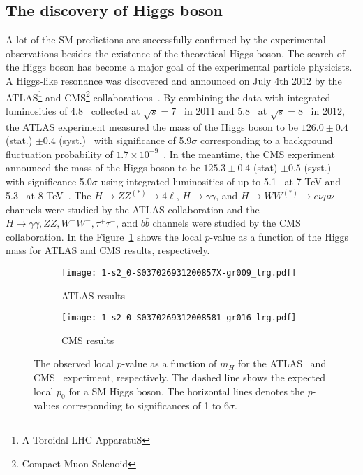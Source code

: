 \subsection{The discovery of Higgs boson}
A lot of the SM predictions are successfully confirmed by the experimental observations besides the existence of the theoretical Higgs boson. 
The search of the Higgs boson has become a major goal of the experimental particle physicists.
A Higgs-like resonance was discovered and announced on July 4th 2012 by the ATLAS\footnote{A Toroidal LHC ApparatuS} and CMS\footnote{Compact Muon Solenoid} collaborations~\cite{Aad:2012tfa,Chatrchyan:2012xdj}.
By combining the data with integrated luminosities of 4.8~{\ifb} collected at $\sqrt{s} = 7$~{\TeV} in 2011 and 5.8~{\ifb} at $\sqrt{s}=8$~{\TeV} in 2012, the ATLAS experiment measured the mass of the Higgs boson to be $126.0 \pm 0.4$ (stat.) $\pm 0.4$ (syst.)~{\GeV} with significance of 5.9$\sigma$ corresponding to a background fluctuation probability of $1.7 \times 10^{-9}$~\cite{Aad:2012tfa}.
In the meantime, the CMS experiment announced the mass of the Higgs boson to be $125.3 \pm 0.4$ (stat) $\pm 0.5$ (syst.)~{\GeV} with significance 5.0$\sigma$ using integrated luminosities of up to 5.1~{\ifb} at 7 TeV and 5.3~{\ifb} at 8 TeV~\cite{Chatrchyan:2012xdj}. 
The $H \rightarrow ZZ^{(*)} \rightarrow 4\ell$, $H \rightarrow \gamma \gamma$, and $H \rightarrow WW^{(*)} \rightarrow e\nu\mu\nu$ channels were studied by the ATLAS collaboration and the $H \rightarrow \gamma \gamma, ZZ, W^{+}W^{-}, \tau^{+}\tau^{-}$, and $b\bar{b}$ channels were studied by the CMS collaboration.
In the Figure~\ref{fig:sm_discovery_of_Higgs} shows the local $p$-value as a function of the Higgs mass for ATLAS and CMS results, respectively.

\begin{figure}[htbp]
\begin{center}
\begin{subfigure}[b]{0.48\textwidth}
\begin{center}
\texttt{[image: 1-s2\_0-S037026931200857X-gr009\_lrg.pdf]}
\caption{ATLAS results}
\end{center}
\end{subfigure}%
\begin{subfigure}[b]{0.48\textwidth}
\begin{center}
\texttt{[image: 1-s2\_0-S0370269312008581-gr016\_lrg.pdf]}
\caption{CMS results}
\end{center}
\end{subfigure}
\end{center}
\caption{The observed local $p$-value as a function of $m_{H}$ for the ATLAS~\cite{Aad:2012tfa} and CMS~\cite{Chatrchyan:2012xdj} experiment, respectively.
The dashed line shows the expected local $p_{0}$ for a SM Higgs boson.
The horizontal lines denotes the $p$-values corresponding to significances of 1 to 6$\sigma$.
}
\label{fig:sm_discovery_of_Higgs}
\end{figure}

